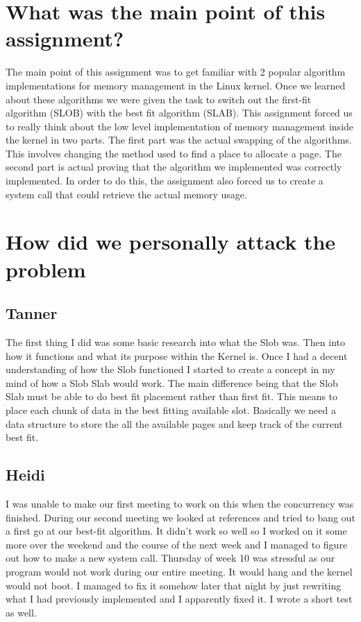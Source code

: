 \documentclass{article}
\begin{document}
\section{What was the main point of this assignment?}
The main point of this assignment was to get familiar with 2 popular algorithm implementations
for memory management in the Linux kernel. Once we learned about these algorithms we were given
the task to switch out the first-fit algorithm (SLOB) with the best fit algorithm (SLAB). This
assignment forced us to really think about the low level implementation of memory management 
inside the kernel in two parts. The first part was the actual swapping of the algorithms. This 
involves changing the method used to find a place to allocate a page. The second part is actual
proving that the algorithm we implemented was correctly implemented. In order to do this, the
assignment also forced us to create a system call that could retrieve the actual memory usage.
\section{How did we personally attack the problem}
\subsection{Tanner}
The first thing I did was some basic research into what the Slob was. 
Then into how it functions and what its purpose within the Kernel is.
Once I had a decent understanding of how the Slob functioned I started to create a concept in my mind of how a Slob Slab would work.
The main difference being that the Slob Slab must be able to do best fit placement rather than first fit.
This means to place each chunk of data in the best fitting available slot.
Basically we need a data structure to store the all the available pages and keep track of the current best fit.
\subsection{Heidi}
I was unable to make our first meeting to work on this when the concurrency was finished. During our second meeting we looked at references and tried to bang out a first go at our best-fit algorithm. It didn't work so well so I worked on it some more over the weekend and the course of the next week and I managed to figure out how to make a new system call. Thursday of week 10 was stressful as our program would not work during our entire meeting. It would hang and the kernel would not boot. I managed to fix it somehow later that night by just rewriting what I had previously implemented and I apparently fixed it. I wrote a short test as well. 
\end{document}
